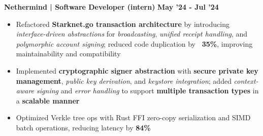 \documentclass[11pt,a4paper]{article}
\newcommand{\job}[3]{
  \textbf{#1 | #2} \hfill \textbf{#3}
}
\begin{document}





\job{Nethermind}{Software Developer (intern)}{May '24 - Jul '24}
{\footnotesize
\begin{itemize}
     \item Refactored \textbf{Starknet.go transaction architecture} by introducing \textit{interface-driven abstractions} for \textit{broadcasting}, \textit{unified receipt handling}, and \textit{polymorphic account signing}; reduced code duplication by \textbf{~35\%}, improving maintainability and compatibility
   
    \item Implemented \textbf{cryptographic signer abstraction} with \textbf{secure private key management}, \textit{public key derivation}, and \textit{keystore integration}; added \textit{context-aware signing} and \textit{error handling} to support \textbf{multiple transaction types} in a \textbf{scalable manner}

    \item Optimized Verkle tree ops with Rust FFI zero-copy serialization and SIMD batch operations, reducing latency by \textbf{84\%} %
\end{itemize}
}
\end{document}
